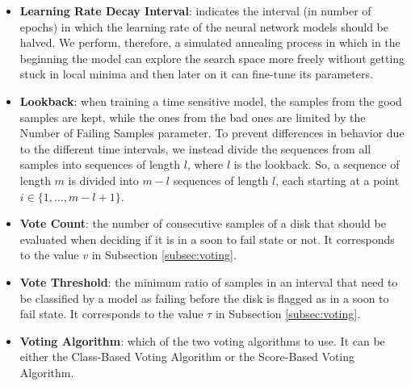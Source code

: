 \begin{itemize}
  \item \textbf{Learning Rate Decay Interval}: indicates the interval (in number of epochs) in which the learning rate of the neural network models should be halved.
  We perform, therefore, a simulated annealing process in which in the beginning the model can explore the search space more freely without getting stuck in local minima and then later on it can fine-tune its parameters.

  \item \textbf{Lookback}: when training a time sensitive model, the samples from the good samples are kept, while the ones from the bad ones are limited by the Number of Failing Samples parameter.
  To prevent differences in behavior due to the different time intervals, we instead divide the sequences from all samples into sequences of length $l$, where $l$ is the lookback.
  So, a sequence of length $m$ is divided into $m-l$ sequences of length $l$, each starting at a point $i \in \{1,\dots,m-l+1\}$.

  \item \textbf{Vote Count}: the number of consecutive samples of a disk that should be evaluated when deciding if it is in a soon to fail state or not.
  It corresponds to the value $v$ in Subsection \ref{subsec:voting}.

  \item \textbf{Vote Threshold}: the minimum ratio of samples in an interval that need to be classified by a model as failing before the disk is flagged as in a soon to fail state.
  It corresponds to the value $\tau$ in Subsection \ref{subsec:voting}.

  \item \textbf{Voting Algorithm}: which of the two voting algorithms to use.
  It can be either the Class-Based Voting Algorithm or the Score-Based Voting Algorithm.
  
\end{itemize}